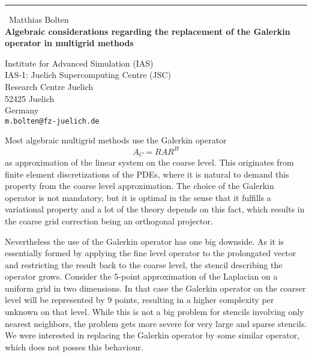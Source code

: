 \documentclass{report}
\begin{document}
\begin{center}
\rule{6in}{1pt} \
{\large Matthias Bolten \\
{\bf Algebraic considerations regarding the replacement of the Galerkin operator in multigrid methods}}

Institute for Advanced Simulation (IAS) \\ IAS-1: Juelich Supercomputing Centre (JSC) \\ Research Centre Juelich \\ 52425 Juelich \\ Germany
\\
{\tt m.bolten@fz-juelich.de}\end{center}

Most algebraic multigrid methods use the Galerkin operator
\begin{equation*}
A_{C} = R A R^{H}
\end{equation*}
as approximation of the linear system on the coarse level. This
originates from finite element discretizations of the PDEs, where it is
natural to demand this property from the coarse level approximation. The
choice of the Galerkin operator is not mandatory, but it is optimal in
the sense that it fulfills a variational property and a lot of the theory
depends on this fact, which results in the coarse grid correction being
an orthogonal projector.

Nevertheless the use of the Galerkin operator has one big downside. As it
is essentially formed by applying the fine level operator to the
prolongated vector and restricting the result back to the coarse level,
the stencil describing the operator grows. Consider the 5-point
approximation of the Laplacian on a uniform grid in two dimensions. In
that case the Galerkin operator on the coarser level will be represented
by 9 points, resulting in a higher complexity per unknown on that level.
While this is not a big problem for stencils involving only nearest
neighbors, the problem gets more severe for very large and sparse
stencils. We were interested in replacing the Galerkin operator by some
similar operator, which does not posses this behaviour.
\end{document}
